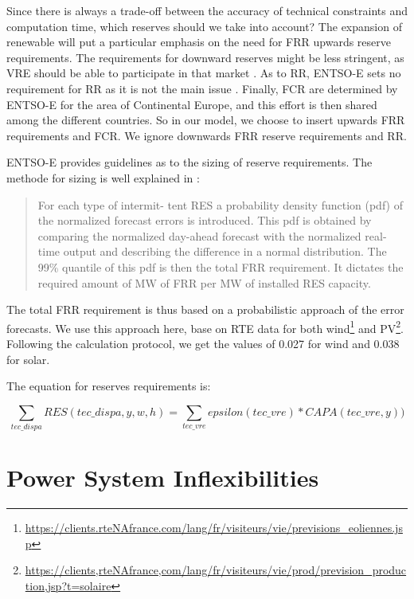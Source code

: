 \documentclass[authoryear]{elsarticle}
\begin{document}
Since there is always a trade-off between the accuracy of technical constraints and computation time, which reserves should we take into account?
The expansion of renewable will put a particular emphasis on the need for FRR upwards reserve requirements. The requirements for downward reserves might be less stringent, as VRE should be able to participate in that market \citep{Stiphout2016, Hirth2015}.
As to RR, ENTSO-E sets no requirement for RR as it is not the main issue \citep{Stiphout2016}. 
Finally, FCR are determined by ENTSO-E for the area of Continental Europe, and this effort is then shared among the different countries. 
So in our model, we choose to insert upwards FRR requirements and FCR. We ignore downwards FRR reserve requirements and RR.

ENTSO-E provides guidelines as to the sizing of reserve requirements. The methode for sizing is well explained in \citet{Stiphout2016}:
\begin{quote}
	For each type of intermit-
	tent RES a probability density function (pdf) of the normalized forecast errors is introduced. This pdf is obtained by comparing the normalized day-ahead forecast with the normalized real-time output and describing the difference in a normal distribution. The 99\% quantile of this pdf is then the total FRR requirement. It dictates the required amount of MW of FRR per MW of installed RES capacity.
\end{quote}

The total FRR requirement is thus based on a probabilistic approach of the error forecasts. We use this approach here, base on RTE data for both wind\footnote{\url{https://clients.rteNAfrance.com/lang/fr/visiteurs/vie/previsions_eoliennes.jsp}} and PV\footnote{\url{https://clients,rteNAfrance,com/lang/fr/visiteurs/vie/prod/prevision_production,jsp?t=solaire}}.
Following the calculation protocol, we get the values of 0.027 for wind and 0.038 for solar.

The equation for reserves requirements is:

\begin{equation}
  \sum_{tec\_dispa} RES(tec\_dispa, y,w,h)   = \sum_{tec\_vre} epsilon(tec\_vre)*CAPA(tec\_vre,y) )
\end{equation}

\section{Power System Inflexibilities}
\end{document}
